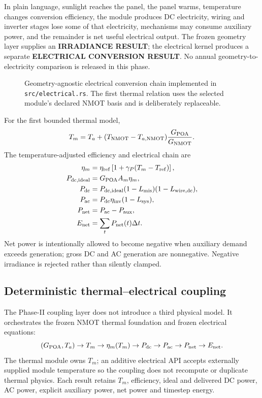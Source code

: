 \documentclass[11pt,a4paper]{article}
\begin{document}
In plain language, sunlight reaches the panel, the panel warms, temperature changes conversion efficiency, the module produces DC electricity, wiring and inverter stages lose some of that electricity, mechanisms may consume auxiliary power, and the remainder is net useful electrical output. The frozen geometry layer supplies an \textbf{IRRADIANCE RESULT}; the electrical kernel produces a separate \textbf{ELECTRICAL CONVERSION RESULT}. No annual geometry-to-electricity comparison is released in this phase.

\begin{figure}[htbp]\centering

\caption{Geometry-agnostic electrical conversion chain implemented in \texttt{src/electrical.rs}. The first thermal relation uses the selected module's declared NMOT basis and is deliberately replaceable.}
\end{figure}

For the first bounded thermal model,
\begin{equation}
T_m=T_a+(T_{\rm NMOT}-T_{a,\rm NMOT})\frac{G_{\rm POA}}{G_{\rm NMOT}}.
\end{equation}
The temperature-adjusted efficiency and electrical chain are
\begin{align}
\eta_m&=\eta_{\rm ref}\left[1+\gamma_P(T_m-T_{\rm ref})\right],\\
P_{\rm dc,ideal}&=G_{\rm POA}A_m\eta_m,\\
P_{\rm dc}&=P_{\rm dc,ideal}(1-L_{\rm mis})(1-L_{\rm wire,dc}),\\
P_{\rm ac}&=P_{\rm dc}\eta_{\rm inv}(1-L_{\rm sys}),\\
P_{\rm net}&=P_{\rm ac}-P_{\rm aux},\\
E_{\rm net}&=\sum_t P_{\rm net}(t)\Delta t.
\end{align}
Net power is intentionally allowed to become negative when auxiliary demand exceeds generation; gross DC and AC generation are nonnegative. Negative irradiance is rejected rather than silently clamped.

\subsection{Deterministic thermal--electrical coupling}
The Phase-II coupling layer does not introduce a third physical model. It orchestrates the frozen NMOT thermal foundation and frozen electrical equations:
\[
(G_{\rm POA},T_a)\rightarrow T_m\rightarrow\eta_m(T_m)\rightarrow P_{\rm dc}\rightarrow P_{\rm ac}\rightarrow P_{\rm net}\rightarrow E_{\rm net}.
\]
The thermal module owns $T_m$; an additive electrical API accepts externally supplied module temperature so the coupling does not recompute or duplicate thermal physics. Each result retains $T_m$, efficiency, ideal and delivered DC power, AC power, explicit auxiliary power, net power and timestep energy.
\end{document}
